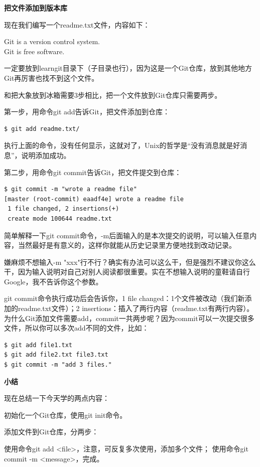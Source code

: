 \documentclass[•]{article}
\begin{document}
\begin{CJK}{UTF8}{gbsn}
{\Large\textbf{把文件添加到版本库}}

现在我们编写一个readme.txt文件，内容如下：

\begin{shaded}
Git is a version control system.\\
Git is free software.
\end{shaded}


\qquad 一定要放到learngit目录下（子目录也行），因为这是一个Git仓库，放到其他地方Git再厉害也找不到这个文件。

\qquad 和把大象放到冰箱需要3步相比，把一个文件放到Git仓库只需要两步。

\qquad 第一步，用命令git add告诉Git，把文件添加到仓库：
\begin{lstlisting} 
$ git add readme.txt/
\end{lstlisting}
\qquad 执行上面的命令，没有任何显示，这就对了，Unix的哲学是“没有消息就是好消息”，说明添加成功。

\qquad 第二步，用命令git commit告诉Git，把文件提交到仓库：
\begin{lstlisting} 
$ git commit -m "wrote a readme file"
[master (root-commit) eaadf4e] wrote a readme file
 1 file changed, 2 insertions(+)
 create mode 100644 readme.txt
\end{lstlisting}
\qquad 简单解释一下git commit命令，-m后面输入的是本次提交的说明，可以输入任意内容，当然最好是有意义的，这样你就能从历史记录里方便地找到改动记录。

\qquad 嫌麻烦不想输入-m "xxx"行不行？确实有办法可以这么干，但是强烈不建议你这么干，因为输入说明对自己对别人阅读都很重要。实在不想输入说明的童鞋请自行Google，我不告诉你这个参数。

\qquad git commit命令执行成功后会告诉你，1 file changed：1个文件被改动（我们新添加的readme.txt文件）；2 insertions：插入了两行内容（readme.txt有两行内容）。
\qquad 为什么Git添加文件需要add，commit一共两步呢？因为commit可以一次提交很多文件，所以你可以多次add不同的文件，比如：
\begin{lstlisting} 
$ git add file1.txt
$ git add file2.txt file3.txt
$ git commit -m "add 3 files."
\end{lstlisting}

{\Large \textbf{ 小结}}

现在总结一下今天学的两点内容：

初始化一个Git仓库，使用git init命令。

添加文件到Git仓库，分两步：

    使用命令git add <file>，注意，可反复多次使用，添加多个文件；
    使用命令git commit -m <message>，完成。



\end{CJK}
\end{document}

